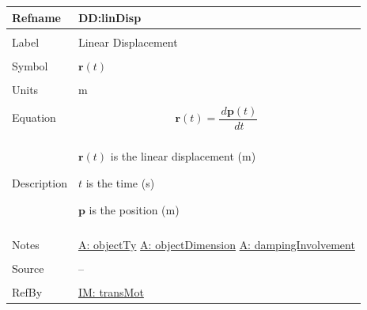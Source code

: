 \documentclass[12pt]{article}
\begin{document}
\noindent \begin{minipage}{\textwidth}
          \begin{tabular}{>{\raggedright}p{}>{\raggedright\arraybackslash}p{}}
          \toprule \textbf{Refname} & \textbf{DD:linDisp}
          \label{DD:linDisp}
          \\ \midrule \\
          Label & Linear Displacement
          \\ \midrule \\
          Symbol & $\mathbf{r}(t)$
          \\ \midrule \\
          Units & m
          \\ \midrule \\
          Equation & \begin{displaymath}
                     \mathbf{r}(t)=\frac{\,d\mathbf{p}\left(t\right)}{\,dt}
                     \end{displaymath}
          \\ \midrule \\
          Description & \begin{symbDescription}
                        \item{$\mathbf{r}(t)$ is the linear displacement (m)}
                        \item{$t$ is the time (s)}
                        \item{$\mathbf{p}$ is the position (m)}
                        \end{symbDescription}
          \\ \midrule \\
          Notes & \hyperref[assumpOT]{A: objectTy}
                  \hyperref[assumpOD]{A: objectDimension}
                  \hyperref[assumpDI]{A: dampingInvolvement}
          \\ \midrule \\
          Source & --
          \\ \midrule \\
          RefBy & \hyperref[IM:transMot]{IM: transMot}
          \\ \bottomrule
          \end{tabular}
          \end{minipage}
\par~
\end{document}

